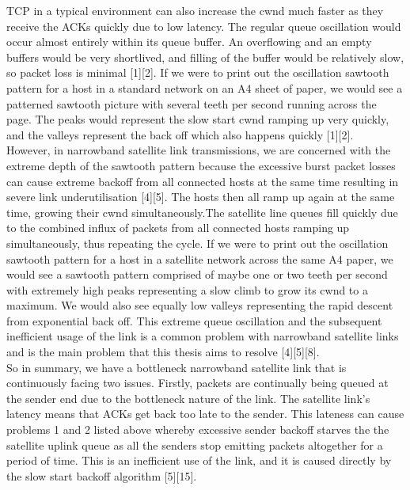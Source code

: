 \documentclass{uathesis}
\begin{document}
TCP in a typical environment can also increase the cwnd much faster as they receive the ACKs quickly due to low latency. The regular queue oscillation would occur almost entirely within its queue buffer. An overflowing and an empty buffers would be very shortlived, and filling of the buffer would be relatively slow, so packet loss is minimal [1][2]. If we were to print out the oscillation sawtooth pattern for a host in a standard network on an A4 sheet of paper, we would see a patterned sawtooth picture with several teeth per second running across the page. The peaks would represent the slow start cwnd ramping up very quickly, and the valleys represent the back off which also happens quickly [1][2]. \\

However, in narrowband satellite link transmissions, we are concerned with the extreme depth of the sawtooth pattern because the excessive burst packet losses can cause extreme backoff from all connected hosts at the same time resulting in severe link underutilisation [4][5]. The hosts then all ramp up again at the same time, growing their cwnd simultaneously.The satellite line queues fill quickly due to the combined influx of packets from all connected hosts ramping up simultaneously, thus repeating the cycle. If we were to print out the oscillation sawtooth pattern for a host in a satellite network across the same A4 paper, we would see a sawtooth pattern comprised of maybe one or two teeth per second with extremely high peaks representing a slow climb to grow its cwnd to a maximum. We would also see equally low valleys representing the rapid descent from exponential back off. This extreme queue oscillation and the subsequent inefficient usage of the link is a common problem with narrowband satellite links and is the main problem that this thesis aims to resolve [4][5][8].\\

So in summary, we have a bottleneck narrowband satellite link that is continuously facing two issues. Firstly, packets are continually being queued at the sender end due to the bottleneck nature of the link. The satellite link's latency means that ACKs get back too late to the sender. This lateness can cause problems 1 and 2 listed above whereby excessive sender backoff starves the the satellite uplink queue as all the senders stop emitting packets altogether for a period of time. This is an inefficient use of the link, and it is caused directly by the slow start backoff algorithm [5][15]. \\
\end{document}
